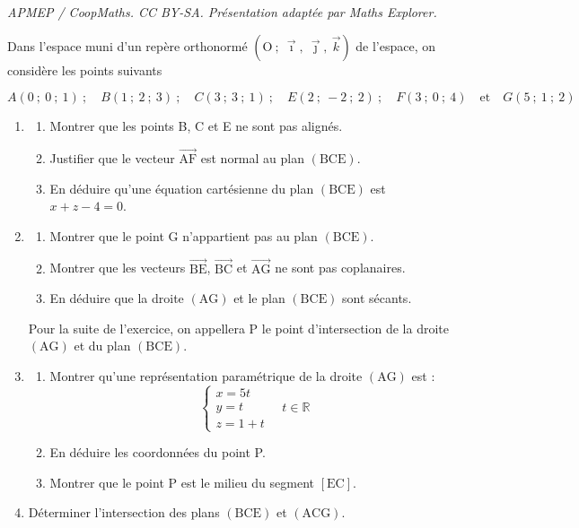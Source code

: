 \documentclass[10pt]{article}
\providecommand{\R}{\mathbb{R}}
\begin{document}
\noindent\textit{APMEP / CoopMaths. CC BY-SA. Présentation adaptée par Maths Explorer.}\par\medskip
Dans l'espace muni d'un repère orthonormé $\left(\text{O}~;~\vec{\imath},~\vec{\jmath},~\vec{k}\right)$ de l'espace, on considère les points suivants

\[A(0~;~0~;~1)~;\quad B(1~;~2~;~3)~;\quad C(3~;~3~;~1)~;\quad E(2~;~-2~;~2)~;\quad F(3~;~0~;~4)\quad \text{et}\quad G(5~;~1~;~2)
\]

\begin{enumerate}
\item \begin{enumerate}
\item Montrer que les points B, C et E ne sont pas alignés.
\item Justifier que le vecteur $\overrightarrow{\mathrm{AF}}$ est normal au plan $(\mathrm{BCE})$.
\item En déduire qu'une équation cartésienne du plan $(\mathrm{BCE})$ est $x+z-4=0$.
\end{enumerate}

\item \begin{enumerate}
\item Montrer que le point G n'appartient pas au plan $(\mathrm{BCE})$.
\item Montrer que les vecteurs $\overrightarrow{\mathrm{BE}}$, $\overrightarrow{\mathrm{BC}}$ et $\overrightarrow{\mathrm{AG}}$ ne sont pas coplanaires.
\item En déduire que la droite $(\mathrm{AG})$ et le plan $(\mathrm{BCE})$ sont sécants.
\end{enumerate}

Pour la suite de l'exercice, on appellera P le point d'intersection de la droite $(\mathrm{AG})$ et du plan $(\mathrm{BCE})$.

\item \begin{enumerate}
\item Montrer qu'une représentation paramétrique de la droite $(\mathrm{AG})$ est :
\[
\left\{
\begin{array}{l}
x=5t\\
y=t\\
z=1+t
\end{array}
\right.\quad t\in \R
\]
\item En déduire les coordonnées du point P.
\item Montrer que le point P est le milieu du segment $[\mathrm{EC}]$.
\end{enumerate}

\item Déterminer l'intersection des plans $(\mathrm{BCE})$ et $(\mathrm{ACG})$.
\end{enumerate}
\end{document}
